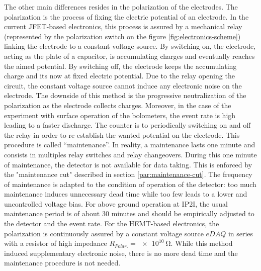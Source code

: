 The other main differences resides in the polarization of the electrodes. The polarization is the process of fixing the electric potential of an electrode.
In the current JFET-based electronics, this process is assured by a mechanical relay (represented by the polarization switch on the figure \ref{fig:electronics-scheme}) linking the electrode to a constant voltage source. By switching on, the electrode, acting as the plate of a capacitor, is accumulating charges and eventually reaches the aimed potential. By switching off, the electrode keeps the accumulating charge and its now at fixed electric potential. Due to the relay opening the circuit, the constant voltage source cannot induce any electronic noise on the electrode.
The downside of this method is the progressive neutralization of the polarization as the electrode collects charges. Moreover, in the case of the \Ricochet{} experiment with surface operation of the bolometers, the event rate is high leading to a faster discharge.
The counter is to periodically switching on and off the relay in order to re-establish the wanted potential on the electrode. This procedure is called “maintenance”. In reality, a maintenance lasts one minute and consists in multiples relay switches and relay changeovers. During this one minute of maintenance, the detector is not available for data taking. This is enforced by the "maintenance cut" described in section \ref{par:maintenance-cut}. The frequency of maintenance is adapted to the condition of operation of the detector: too much maintenance induces unnecessary dead time while too few leads to a lower and uncontrolled voltage bias. For above ground operation at IP2I, the usual maintenance period is of about 30 minutes and should be empirically adjusted to the detector and the event rate.
For the HEMT-based electronics, the polarization is continuously assured by a constant voltage source $eDAQ$ in series with a resistor of high impedance $R_{Polar.} = \SI{e10}{\ohm}$. While this method induced supplementary electronic noise, there is no more dead time and the maintenance procedure is not needed.

